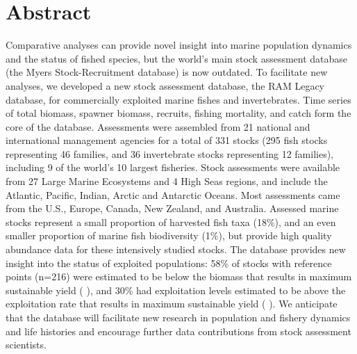 \section*{Abstract}

Comparative analyses can provide novel insight into marine population dynamics and the status of fished species, but the world's main stock assessment database (the Myers Stock-Recruitment database) is now outdated.  
To facilitate new analyses, we developed a new stock assessment database, the RAM Legacy database, for commercially exploited marine fishes and invertebrates. 
Time series of total biomass, spawner biomass, recruits, fishing mortality, and catch form the core of the database. 
Assessments were assembled from 21 national and international management agencies for a total of 331 stocks (295 fish stocks representing 46 families, and 36 invertebrate stocks representing 12 families), including 9 of the world's 10 largest fisheries. Stock assessments were available from 27 Large Marine Ecosystems and 4 High Seas regions, and include the Atlantic, Pacific, Indian, Arctic and Antarctic Oceans. 
Most assessments came from the U.S., Europe, Canada, New Zealand, and Australia. Assessed marine stocks represent a small proportion of harvested fish taxa (18\%), and an even smaller proportion of marine fish biodiversity (1\%), but provide high quality abundance data for these intensively studied stocks. 
The database provides new insight into the status of exploited populations: 58\% of stocks with reference points (n=216) were estimated to be below the biomass that results in maximum sustainable yield ( ), and 30\% had exploitation levels estimated to be above the exploitation rate that results in maximum sustainable yield ( ).
We anticipate that the database will facilitate new research in population and fishery dynamics and life histories and encourage further data contributions from stock assessment scientists.

